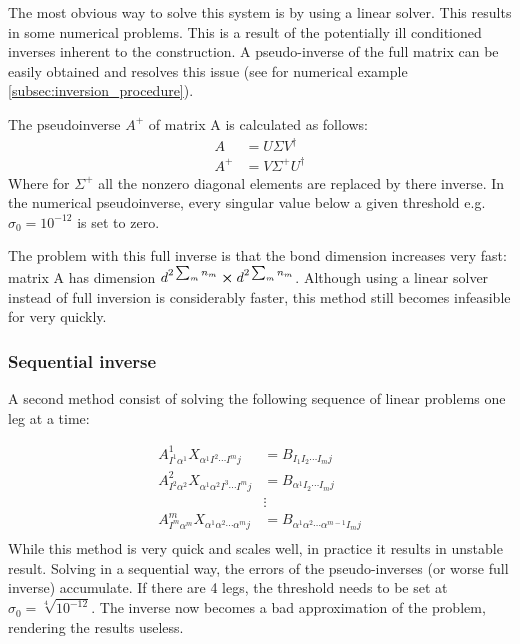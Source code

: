 The most obvious way to solve this system is by using a linear solver. This results in some numerical problems. This is a result of the potentially ill conditioned inverses inherent to the construction. A pseudo-inverse of the full matrix can be easily obtained and resolves this issue (see for numerical example \cref{subsec:inversion_procedure}).

The pseudoinverse $A^{+}$ of matrix A is calculated as follows:
\begin{align}
    A     & = U \Sigma V^{\dagger}     \\
    A^{+} & = V \Sigma^{+} U^{\dagger}
\end{align}
Where for $\Sigma^{+}$ all the nonzero diagonal elements are replaced by there inverse. In the numerical pseudoinverse, every singular value below a given threshold e.g. $\sigma_0 = 10^{-12}$ is set to zero.

The problem with this full inverse is that the bond dimension increases very fast: matrix A has dimension $d^ {2 \sum_m n_m } \cross d^ {2 \sum_m n_m } $. Although using a linear solver instead of full inversion is considerably faster, this method still becomes infeasible for very quickly.

\subsubsection{Sequential inverse}

A second method consist of solving the following sequence of linear problems one leg at a time:

\begin{equation}
    \begin{split}
        A^1_{ I^1 \alpha^1 } X_{ \alpha^1  I^2 \cdots I^m j} &=  B_{  I_1  I_2 \cdots I_m   j }\\
        A^2_{ I^2 \alpha^2 } X_{ \alpha^1   \alpha^2  I^3 \cdots I^m j} &=  B_{  \alpha^1  I_2 \cdots I_m   j }\\
        &\vdots\\
        A^m_{ I^m \alpha^m } X_{ \alpha^1 \alpha^2 \cdots \alpha^m j  } &=  B_{ \alpha^1 \alpha^2 \cdots \alpha^{m-1} I_m   j }\\
    \end{split}
\end{equation}
While this method is very quick and scales well, in practice it results in unstable result. Solving in a sequential way, the errors of the pseudo-inverses (or worse full inverse) accumulate. If there are 4 legs, the threshold needs to be set at $ \sigma_0 = \sqrt[4]{ 10^{-12} } $. The inverse now becomes a bad approximation of the problem, rendering the results useless.


